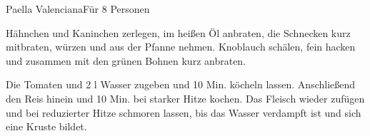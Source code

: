 \begin{recipe}{Paella Valenciana}{Für 8 Personen}
  \label{Paella-Valencia}
  \inglist

  \steps Hähnchen und Kaninchen zerlegen, im heißen Öl anbraten, die Schnecken
  kurz mitbraten, würzen und aus der Pfanne nehmen. Knoblauch schälen, fein
  hacken und zusammen mit den grünen Bohnen kurz anbraten.

  Die Tomaten und 2 \halb l Wasser zugeben und 10 Min. köcheln lassen.
  Anschließend den Reis hinein und 10 Min. bei starker Hitze kochen. Das
  Fleisch wieder zufügen und bei reduzierter Hitze schmoren lassen, bis das
  Wasser verdampft ist und sich eine Kruste bildet.

\end{recipe}


